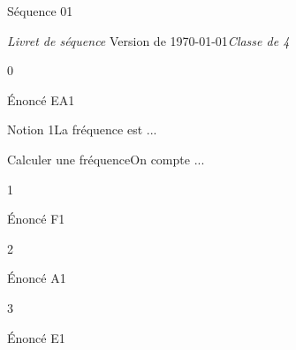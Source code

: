 \documentclass[a4paper,11pt]{article}
\begin{document}
\providecommand{\theHExoNum}{\theExoNum}
\providecommand{\theHNotionNum}{\theNotionNum}
\providecommand{\theHMethodeNum}{\theMethodeNum}

\seqCreeCompteurs
{}
\seqInitCorriges
\seqInitAnnexes
\seqInitRemediation

\begin{boiteTitreGen}{Séquence 01}
  \begin{minipage}[c][100pt][c]{\linewidth}
    \vfill \textit{Livret de séquence} \hfill
    \vfill {}
    \vfill Version de \datemoisannee\today \hfill \textit{Classe de 4\ieme}
  \end{minipage}
\end{boiteTitreGen}


\clearpage
\begin{seqSerieExos}{0}
\begin{seqExercice}[nom={EA1}]
Énoncé EA1
\end{seqExercice}
\end{seqSerieExos}

\clearpage
{}

\begin{seqNotion}{Notion 1}{La fréquence est ...}
\end{seqNotion}

\clearpage
{}

\begin{seqMethode}{Calculer une fréquence}{On compte ...}
\end{seqMethode}

\clearpage
\begin{seqSerieExos}{1}
\begin{seqExercice}[nom={F1},obj={02},remediation=oui]
Énoncé F1
\end{seqExercice}
\end{seqSerieExos}

\clearpage
\begin{seqSerieExos}{2}
\begin{seqExercice}[nom={A1},obj={02}]
Énoncé A1
\end{seqExercice}
\end{seqSerieExos}

\clearpage
\begin{seqSerieExos}{3}
\begin{seqExercice}[nom={E1},obj={02}]
Énoncé E1
\end{seqExercice}
\end{seqSerieExos}

\clearpage
\seqAfficheAnnexes
\clearpage
\seqAfficheCorriges

\seqAfficheRemediations
\seqAfficheCorrigesRemediation
\end{document}
